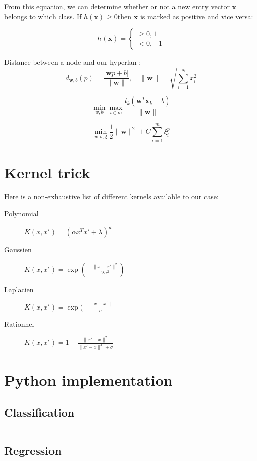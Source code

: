 From this equation, we can determine whether or not a new entry vector $\mathbf x$ belongs to which class. If $h(\mathbf x) \geq 0$then $\mathbf x$ is marked as positive and vice versa:

\begin{equation}
	h(\mathbf x) = \begin{cases}
		\geq 0, 1 \\
		< 0, -1
	\end{cases}
\end{equation}

Distance between a node and our hyperlan :
\begin{equation}
	d_{\mathbf w, b}(p) = \frac{| \mathbf w p + b |}{\lVert \mathbf w \rVert}, \quad \lVert \mathbf w \rVert = \sqrt{\sum_{i=1}^N x_i^2}
\end{equation}


\begin{equation}
	\min_{w,b} \max_{i\in m} \frac{ l_k(\mathbf w^T\mathbf x_k+b) }{ \lVert \mathbf w \rVert }
\end{equation}

\begin{equation}
	\min_{w,b,\xi} \frac{1}{2} \lVert \mathbf w \rVert ^2 + C \sum_{i=1}^m \xi_i^p
\end{equation}


\section{Kernel trick}

Here is a non-exhaustive list of different kernels available to our case:
\begin{description}
	\item[Polynomial] $K(x, x\prime) = (\alpha x^T x\prime + \lambda )^d$
	\item[Gaussien] $K(x, x\prime) = \exp(-\frac{\lVert x - x\prime \rVert^2}{2\sigma^2})$
	\item[Laplacien] $K(x, x\prime) = \exp(-\frac{\lVert x - x\prime\rVert}{\sigma}$
	\item[Rationnel] $K(x, x\prime) = 1 - \frac{\lVert x\prime - x \rVert^2}{\lVert x\prime - x \rVert^2 + \sigma}$
\end{description}


\section{Python implementation}

\subsection{Classification}

\inputminted{python}{code/svm.python}

\subsection{Regression}
